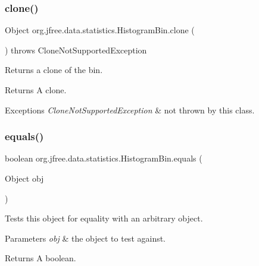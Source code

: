 \subsubsection{\texorpdfstring{clone()}{clone()}}
{\footnotesize\ttfamily Object org.\+jfree.\+data.\+statistics.\+Histogram\+Bin.\+clone (\begin{DoxyParamCaption}{ }\end{DoxyParamCaption}) throws Clone\+Not\+Supported\+Exception}

Returns a clone of the bin.

\begin{DoxyReturn}{Returns}
A clone.
\end{DoxyReturn}

\begin{DoxyExceptions}{Exceptions}
{\em Clone\+Not\+Supported\+Exception} & not thrown by this class. \\
\hline
\end{DoxyExceptions}
\mbox{\label{classorg_1_1jfree_1_1data_1_1statistics_1_1_histogram_bin_a60652c9f6fdb2eb763c50f6660b2f371}} 
\subsubsection{\texorpdfstring{equals()}{equals()}}
{\footnotesize\ttfamily boolean org.\+jfree.\+data.\+statistics.\+Histogram\+Bin.\+equals (\begin{DoxyParamCaption}\item[{Object}]{obj }\end{DoxyParamCaption})}

Tests this object for equality with an arbitrary object.


\begin{DoxyParams}{Parameters}
{\em obj} & the object to test against.\\
\hline
\end{DoxyParams}
\begin{DoxyReturn}{Returns}
A boolean. 
\end{DoxyReturn}
\mbox{\label{classorg_1_1jfree_1_1data_1_1statistics_1_1_histogram_bin_a865d88dd649473a8a3b596992ef280ea}} 

